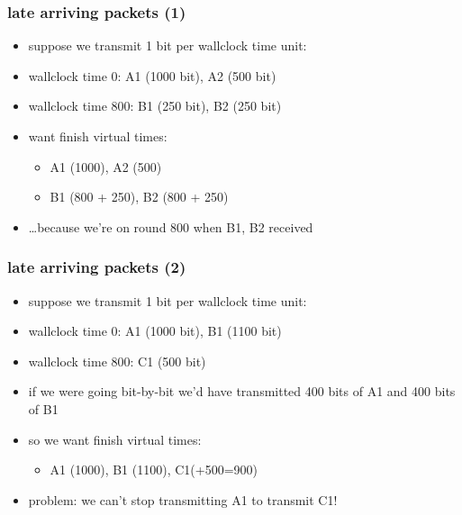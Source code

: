 \begin{frame}
\frametitle{late arriving packets (1)}
\begin{itemize}
\item suppose we transmit 1 bit per wallclock time unit:
\item wallclock time 0: A1 (1000 bit), A2 (500 bit)
\item wallclock time 800: B1 (250 bit), B2 (250 bit)
\vspace{.5cm}
\item want finish virtual times:
    \begin{itemize}
    \item A1 (1000), A2 (500)
    \item B1 (800 + 250), B2 (800 + 250)
    \end{itemize}
\item \ldots because we're on round 800 when B1, B2 received
\end{itemize}
\end{frame}

\begin{frame}
\frametitle{late arriving packets (2)}
\begin{itemize}
\item suppose we transmit 1 bit per wallclock time unit:
\item wallclock time 0: A1 (1000 bit), B1 (1100 bit)
\item wallclock time 800: C1 (500 bit)
\vspace{.5cm}
\item if we were going bit-by-bit we'd have transmitted 400 bits of A1 and 400 bits of B1
\item<2-> so we want finish virtual times:
    \begin{itemize}
    \item A1 (1000), B1 (1100), C1(+500=900)
    \end{itemize}
\item<3-> problem: we can't stop transmitting A1 to transmit C1!
\end{itemize}
\end{frame}

